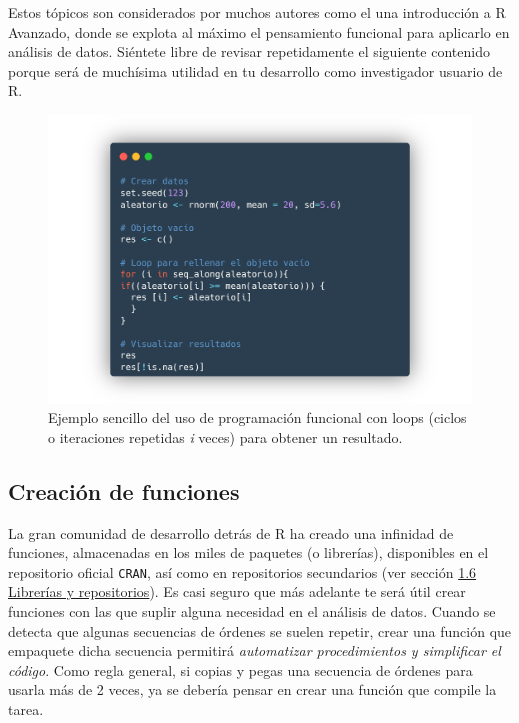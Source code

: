 \documentclass[
]{article}
\theoremstyle{definition}
\theoremstyle{definition}
\theoremstyle{definition}
\theoremstyle{definition}
\theoremstyle{remark}
\begin{document}
Estos tópicos son considerados por muchos autores como el una introducción a R Avanzado, donde se explota al máximo el pensamiento funcional para aplicarlo en análisis de datos. Siéntete libre de revisar repetidamente el siguiente contenido porque será de muchísima utilidad en tu desarrollo como investigador usuario de R.



\begin{figure}

{\centering \includegraphics[width=1\linewidth]{figs/screenshots/programming} 

}

\caption{Ejemplo sencillo del uso de programación funcional con loops (ciclos o iteraciones repetidas \emph{i} veces) para obtener un resultado.}\label{fig:figura48}
\end{figure}

\hypertarget{creacion-fun}{%
\subsection{Creación de funciones}\label{creacion-fun}}

La gran comunidad de desarrollo detrás de R ha creado una infinidad de funciones, almacenadas en los miles de paquetes (o librerías), disponibles en el repositorio oficial \texttt{CRAN}, así como en repositorios secundarios (ver sección \protect\hyperlink{libreruxedas-y-repositorios}{1.6 Librerías y repositorios}). Es casi seguro que más adelante te será útil crear funciones con las que suplir alguna necesidad en el análisis de datos. Cuando se detecta que algunas secuencias de órdenes se suelen repetir, crear una función que empaquete dicha secuencia permitirá \emph{automatizar procedimientos y simplificar el código}. Como regla general, si copias y pegas una secuencia de órdenes para usarla más de 2 veces, ya se debería pensar en crear una función que compile la tarea.
\end{document}
